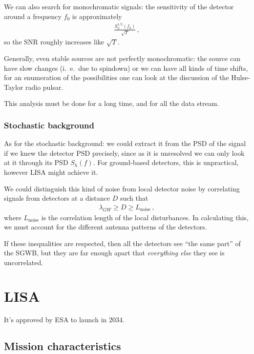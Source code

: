 \documentclass[main.tex]{subfiles}
\begin{document}
We can also search for monochromatic signals: the sensitivity of the detector around a frequency \(f_0 \) is approximately 
%
\begin{align}
\frac{S_n^{1/2} (f_0 )}{\sqrt{T}}
\,,
\end{align}
%
so the SNR roughly increases like \(\sqrt{T}\). 

Generally, even stable sources are not perfectly monochromatic: the source can have slow changes (i.\ e.\ due to spindown) or we can have all kinds of time shifts, for an enumeration of the possibilities one can look at the discussion of the Hulse-Taylor radio pulsar. 


This analysis must be done for a long time, and for all the data stream.

\subsubsection{Stochastic background}

As for the stochastic background: we could extract it from the PSD of the signal if we knew the detector PSD precisely, since as it is unresolved we can only look at it through its PSD \(S_h (f)\). 
For ground-based detectors, this is unpractical, however LISA might 
achieve it. 

We could distinguish this kind of noise from local detector noise by correlating signals from detectors at a distance \(D\) such that 
%
\begin{align}
\lambda_{GW} \geq D \geq L _{\text{noise}}
\,,
\end{align}
%
where \(L _{\text{noise}}\) is the correlation length of the local disturbances. 
In calculating this, we must account for the different antenna patterns of the detectors.

If these inequalities are respected, then all the detectors see ``the same part'' of the SGWB, but they are far enough apart that \emph{everything else} they see is uncorrelated. 

\section{LISA}

It's approved by ESA to launch in 2034. 

\subsection{Mission characteristics}
\end{document}
